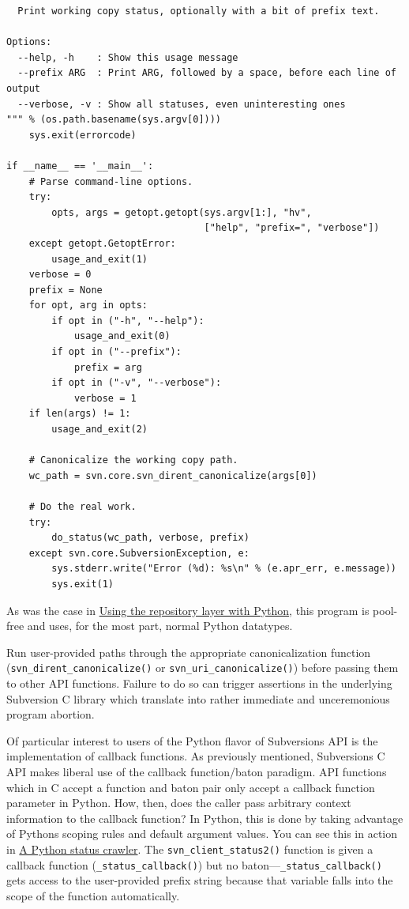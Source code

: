 \begin{verbatim}
  Print working copy status, optionally with a bit of prefix text.

Options:
  --help, -h    : Show this usage message
  --prefix ARG  : Print ARG, followed by a space, before each line of output
  --verbose, -v : Show all statuses, even uninteresting ones
""" % (os.path.basename(sys.argv[0])))
    sys.exit(errorcode)
    
if __name__ == '__main__':
    # Parse command-line options.
    try:
        opts, args = getopt.getopt(sys.argv[1:], "hv",
                                   ["help", "prefix=", "verbose"])
    except getopt.GetoptError:
        usage_and_exit(1)
    verbose = 0
    prefix = None
    for opt, arg in opts:
        if opt in ("-h", "--help"):
            usage_and_exit(0)
        if opt in ("--prefix"):
            prefix = arg
        if opt in ("-v", "--verbose"):
            verbose = 1
    if len(args) != 1:
        usage_and_exit(2)
            
    # Canonicalize the working copy path.
    wc_path = svn.core.svn_dirent_canonicalize(args[0])

    # Do the real work.
    try:
        do_status(wc_path, verbose, prefix)
    except svn.core.SubversionException, e:
        sys.stderr.write("Error (%d): %s\n" % (e.apr_err, e.message))
        sys.exit(1)
\end{verbatim}

As was the case in
\hyperref[svn.developer.usingapi.otherlangs.ex-1]{Using the repository
layer with Python}, this program is pool-free and uses, for the most
part, normal Python datatypes.

Run user-provided paths through the appropriate canonicalization
function (\texttt{svn\_dirent\_canonicalize()} or
\texttt{svn\_uri\_canonicalize()}) before passing them to other API
functions. Failure to do so can trigger assertions in the underlying
Subversion C library which translate into rather immediate and
unceremonious program abortion.

Of particular interest to users of the Python flavor of
Subversion\textquotesingle s API is the implementation of callback
functions. As previously mentioned, Subversion\textquotesingle s C API
makes liberal use of the callback function/baton paradigm. API functions
which in C accept a function and baton pair only accept a callback
function parameter in Python. How, then, does the caller pass arbitrary
context information to the callback function? In Python, this is done by
taking advantage of Python\textquotesingle s scoping rules and default
argument values. You can see this in action in
\hyperref[svn.developer.usingapi.otherlangs.ex-2]{A Python status
crawler}. The \texttt{svn\_client\_status2()} function is given a
callback function (\texttt{\_status\_callback()}) but no
baton---\texttt{\_status\_callback()} gets access to the user-provided
prefix string because that variable falls into the scope of the function
automatically.

